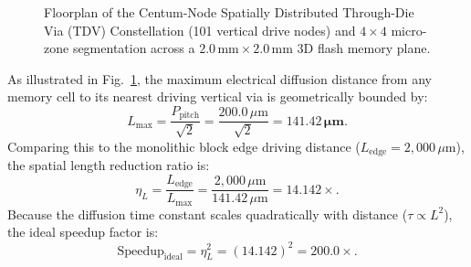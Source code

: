 \documentclass[journal]{IEEEtran}
\begin{document}
\begin{figure}[!t]
{
}
\caption{Floorplan of the Centum-Node Spatially Distributed Through-Die Via (TDV) Constellation (101 vertical drive nodes) and $4\times 4$ micro-zone segmentation across a $2.0\,\text{mm} \times 2.0\,\text{mm}$ 3D flash memory plane.}
\label{fig:101_pillar_floorplan}
\end{figure}

As illustrated in Fig.~\ref{fig:101_pillar_floorplan}, the maximum electrical diffusion distance from any memory cell to its nearest driving vertical via is geometrically bounded by:
\begin{equation}
    L_{\max} = \frac{P_{\text{pitch}}}{\sqrt{2}} = \frac{200.0\,\mu\text{m}}{\sqrt{2}} = \mathbf{141.42\,\mu\text{m}}.
\end{equation}
Comparing this to the monolithic block edge driving distance ($L_{\text{edge}} = 2,000\,\mu\text{m}$), the spatial length reduction ratio is:
\begin{equation}
    \eta_L = \frac{L_{\text{edge}}}{L_{\max}} = \frac{2,000\,\mu\text{m}}{141.42\,\mu\text{m}} = 14.142\times.
\end{equation}
Because the diffusion time constant scales quadratically with distance ($\tau \propto L^2$), the ideal speedup factor is:
\begin{equation}
    \text{Speedup}_{\text{ideal}} = \eta_L^2 = (14.142)^2 = \mathbf{200.0\times}.
\end{equation}
\end{document}
